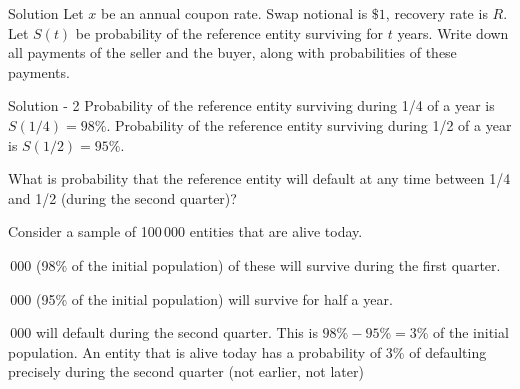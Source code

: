 \documentclass{beamer}
\begin{document}
\begin{frame}{Solution}
\justify
Let $x$ be an annual coupon rate. Swap notional is $\$1$, recovery rate is $R$. Let $S(t)$ be probability of the reference entity surviving for $t$ years. Write down all payments of the seller and the buyer, along with probabilities of these payments.

\begin{center}
\end{center}
\end{frame}



\begin{frame}{Solution - 2}
\justify
Probability of the reference entity surviving during 1/4 of a year is $S(1/4) = 98\%$. Probability of the reference entity surviving during 1/2 of a year is $S(1/2) = 95\%$. 

\justify
What is probability that the reference entity will default at any time between 1/4 and 1/2 (during the second quarter)? 

\justify
Consider a sample of 100\,000 entities that are alive today.

\,000 (98\% of the initial population) of these will survive during the first quarter. 

\,000 (95\% of the initial population) will survive for half a year.

\,000 will default during the second quarter. This is $98\% - 95\% = 3\%$ of the initial population. An entity that is alive today has a probability of 3\% of defaulting precisely during the second quarter (not earlier, not later)
\end{frame}
\end{document}
